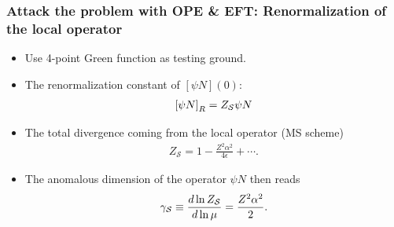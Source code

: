 \begin{frame}
	\frametitle{Attack the problem with OPE \& EFT: Renormalization of the local operator}

	
	\begin{itemize}
		\item Use 4-point Green function as testing ground. 
		\item The renormalization constant of $[\psi N](0)$: 
		\begin{align}
			\bqty{\psi N}_R=Z_\mathcal{S}{\psi N}
		\end{align}
		\item The total divergence coming from the local operator (MS scheme)
		\begin{align}
			Z_{\mathcal{S}}=1-\frac{Z^2\alpha^2}{4\epsilon}+\cdots.
			\label{compo-renorm}
		\end{align}
		\item The anomalous dimension of the operator $\psi N$ then reads
		\begin{align}
			\gamma_{\mathcal{S}}\equiv {d\ln Z_\mathcal{S} \over d\ln\mu}= {Z^2\alpha^2\over 2}.
			\label{ano-dim}
		\end{align}
	\end{itemize}

\end{frame}

